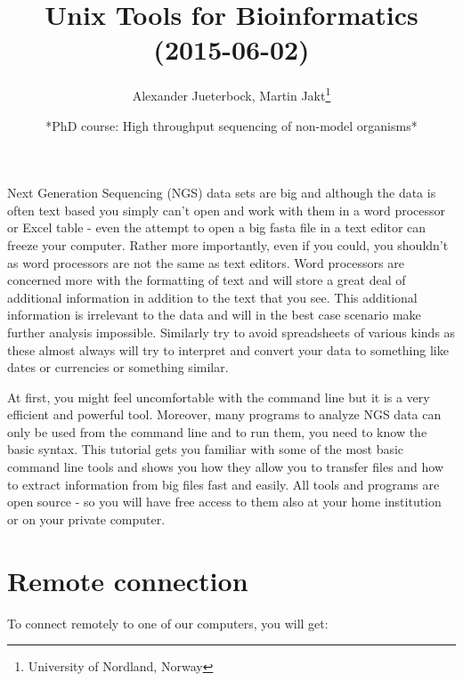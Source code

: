 \documentclass[11pt]{article}
\title{\textbf{Unix Tools for Bioinformatics} (2015-06-02)}
\author{Alexander Jueterbock, Martin Jakt\thanks{University of Nordland, Norway}}
\date{*PhD course: High throughput sequencing of non-model organisms*}
\begin{document}
\maketitle

\setcounter{tocdepth}{3}
\tableofcontents
\vspace*{1cm}


























Next Generation Sequencing (NGS) data sets are big and although the data is
often text based you
simply can't open and work with them in a word processor or Excel
table - even the attempt to open a big fasta file in a text editor can
freeze your computer. Rather more importantly, even if you could, you
shouldn't as word processors are not the same as text editors. Word
processors are concerned more with the formatting of text and will store a
great deal of additional information in addition to the text that you
see. This additional information is irrelevant to the data and will in the
best case scenario make further analysis impossible. Similarly try to avoid
spreadsheets of various kinds as these almost always will try to interpret
and convert your data to something like dates or currencies or something similar.

At first, you might feel uncomfortable with the
command line but it is a very efficient and powerful tool. Moreover,
many programs to analyze NGS data can only be used from the command line and to
run them, you need to know the basic syntax. This tutorial gets you
familiar with some of the most basic command line tools and shows
you how they allow you to transfer files and how to extract
information from big files fast and easily. All tools and programs are
open source - so you will have free access to them also at your home
institution or on your private computer.


\section{Remote connection}
\label{sec-1}

To connect remotely to one of our computers, you will get:
\end{document}
